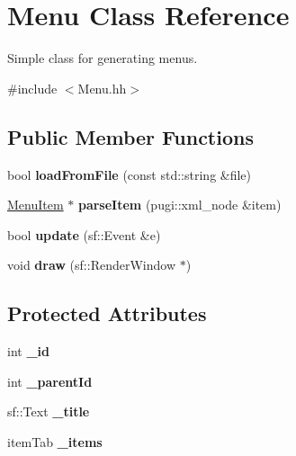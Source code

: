 \hypertarget{classMenu}{}\section{Menu Class Reference}
\label{classMenu}


Simple class for generating menus.  




{\ttfamily \#include $<$Menu.\+hh$>$}

\subsection*{Public Member Functions}
\begin{DoxyCompactItemize}
\item 
bool {\bfseries load\+From\+File} (const std\+::string \&file)\hypertarget{classMenu_a14487681377acc4bede19cc199b40bbf}{}\label{classMenu_a14487681377acc4bede19cc199b40bbf}

\item 
\hyperlink{classMenuItem}{Menu\+Item} $\ast$ {\bfseries parse\+Item} (pugi\+::xml\+\_\+node \&item)\hypertarget{classMenu_af309eab23ca546c859678a8405f922c7}{}\label{classMenu_af309eab23ca546c859678a8405f922c7}

\item 
bool {\bfseries update} (sf\+::\+Event \&e)\hypertarget{classMenu_acd6b589302d8825fe6a036c5d04b388b}{}\label{classMenu_acd6b589302d8825fe6a036c5d04b388b}

\item 
void {\bfseries draw} (sf\+::\+Render\+Window $\ast$)\hypertarget{classMenu_a19aedf143b363bd1e4c60113db06b626}{}\label{classMenu_a19aedf143b363bd1e4c60113db06b626}

\end{DoxyCompactItemize}
\subsection*{Protected Attributes}
\begin{DoxyCompactItemize}
\item 
int {\bfseries \+\_\+id}\hypertarget{classMenu_a4871f5c25e4feefc152174bb5f4848ed}{}\label{classMenu_a4871f5c25e4feefc152174bb5f4848ed}

\item 
int {\bfseries \+\_\+parent\+Id}\hypertarget{classMenu_acc99927a31ff10e802ec6dca998e9590}{}\label{classMenu_acc99927a31ff10e802ec6dca998e9590}

\item 
sf\+::\+Text {\bfseries \+\_\+title}\hypertarget{classMenu_ab478d86fdefea7267f3518ebcedda9af}{}\label{classMenu_ab478d86fdefea7267f3518ebcedda9af}

\item 
item\+Tab {\bfseries \+\_\+items}\hypertarget{classMenu_a0376395345d2c4384a13fb6d063ed46f}{}\label{classMenu_a0376395345d2c4384a13fb6d063ed46f}

\end{DoxyCompactItemize}


